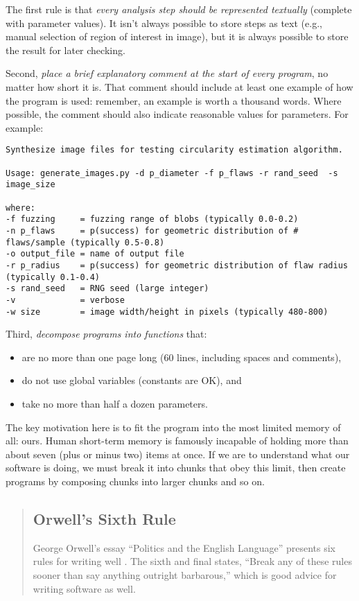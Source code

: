\documentclass[10pt]{article}
\begin{document}
The first rule is that \emph{every analysis step should be represented
textually} (complete with parameter values). It isn't always possible to
store steps as text (e.g., manual selection of region of interest in
image), but it is always possible to store the result for later
checking.

Second, \emph{place a brief explanatory comment at the start of every
program}, no matter how short it is. That comment should include at
least one example of how the program is used: remember, an example is
worth a thousand words. Where possible, the comment should also indicate
reasonable values for parameters. For example:

\begin{verbatim}
Synthesize image files for testing circularity estimation algorithm.

Usage: generate_images.py -d p_diameter -f p_flaws -r rand_seed  -s image_size

where:
-f fuzzing     = fuzzing range of blobs (typically 0.0-0.2)
-n p_flaws     = p(success) for geometric distribution of # flaws/sample (typically 0.5-0.8)
-o output_file = name of output file
-r p_radius    = p(success) for geometric distribution of flaw radius (typically 0.1-0.4)
-s rand_seed   = RNG seed (large integer)
-v             = verbose
-w size        = image width/height in pixels (typically 480-800)
\end{verbatim}

Third, \emph{decompose programs into functions} that:

\begin{itemize}
\item
  are no more than one page long (60 lines, including spaces and
  comments),
\item
  do not use global variables (constants are OK), and
\item
  take no more than half a dozen parameters.
\end{itemize}

The key motivation here is to fit the program into the most limited
memory of all: ours. Human short-term memory is famously incapable of
holding more than about seven (plus or minus two) items at once. If we
are to understand what our software is doing, we must break it into
chunks that obey this limit, then create programs by composing chunks
into larger chunks and so on.

\begin{quote}
\subsection*{Orwell's Sixth Rule}
George Orwell's essay ``Politics and the English Language''
presents six rules for writing well \cite{orwell2002}.
The sixth and final states,
``Break any of these rules sooner than say anything outright barbarous,''
which is good advice for writing software as well.
\end{quote}
\end{document}
